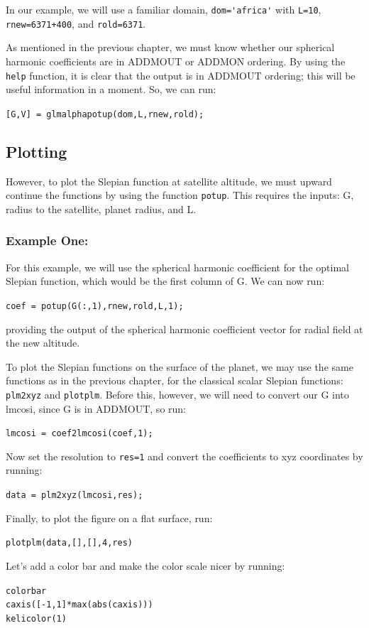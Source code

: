 \documentclass[11pt]{article}
\begin{document}
In our example, we will use a familiar domain, \verb+dom='africa'+ with \verb+L=10+, \verb|rnew=6371+400|, and \verb+rold=6371+.  

As mentioned in the previous chapter, we must know whether our spherical harmonic coefficients are in ADDMOUT or ADDMON ordering.  By using the \verb+help+ function, it is clear that the output is in ADDMOUT ordering; this will be useful information in a moment.  So, we can run:

\verb+[G,V] = glmalphapotup(dom,L,rnew,rold);+

\subsection{Plotting}
However, to plot the Slepian function at satellite altitude, we must upward continue the functions by using the function \verb+potup+.  This requires the inputs: G, radius to the satellite, planet radius, and L.  

\subsubsection{Example One:}
For this example, we will use the spherical harmonic coefficient for the optimal Slepian function, which would be the first column of G.  We can now run:

\verb+coef = potup(G(:,1),rnew,rold,L,1);+

providing the output of the spherical harmonic coefficient vector for radial field at the new altitude.

To plot the Slepian functions on the surface of the planet, we may use the same functions as in the previous chapter, for the classical scalar Slepian functions: \verb+plm2xyz+ and \verb+plotplm+.  Before this, however, we will need to convert our G into lmcosi, since G is in ADDMOUT, so run:

\verb+lmcosi = coef2lmcosi(coef,1);+

Now set the resolution to \verb+res=1+ and convert the coefficients to xyz coordinates by running:

\verb+data = plm2xyz(lmcosi,res);+

Finally, to plot the figure on a flat surface, run:

\verb+plotplm(data,[],[],4,res)+

Let's add a color bar and make the color scale nicer by running:

\verb+colorbar+\\
\verb+caxis([-1,1]*max(abs(caxis)))+\\
\verb+kelicolor(1)+
\end{document}
